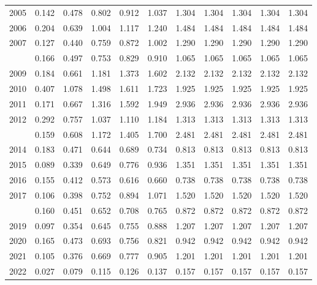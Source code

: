 \documentclass[
]{article}
\begin{document}
\begin{longtable}[t]{lrrrrrrrrrr}
2005 & 0.142 & 0.478 & 0.802 & 0.912 & 1.037 & 1.304 & 1.304 & 1.304 & 1.304 & 1.304\\
2006 & 0.204 & 0.639 & 1.004 & 1.117 & 1.240 & 1.484 & 1.484 & 1.484 & 1.484 & 1.484\\
2007 & 0.127 & 0.440 & 0.759 & 0.872 & 1.002 & 1.290 & 1.290 & 1.290 & 1.290 & 1.290\\
\addlinespace
2008 & 0.166 & 0.497 & 0.753 & 0.829 & 0.910 & 1.065 & 1.065 & 1.065 & 1.065 & 1.065\\
2009 & 0.184 & 0.661 & 1.181 & 1.373 & 1.602 & 2.132 & 2.132 & 2.132 & 2.132 & 2.132\\
2010 & 0.407 & 1.078 & 1.498 & 1.611 & 1.723 & 1.925 & 1.925 & 1.925 & 1.925 & 1.925\\
2011 & 0.171 & 0.667 & 1.316 & 1.592 & 1.949 & 2.936 & 2.936 & 2.936 & 2.936 & 2.936\\
2012 & 0.292 & 0.757 & 1.037 & 1.110 & 1.184 & 1.313 & 1.313 & 1.313 & 1.313 & 1.313\\
\addlinespace
2013 & 0.159 & 0.608 & 1.172 & 1.405 & 1.700 & 2.481 & 2.481 & 2.481 & 2.481 & 2.481\\
2014 & 0.183 & 0.471 & 0.644 & 0.689 & 0.734 & 0.813 & 0.813 & 0.813 & 0.813 & 0.813\\
2015 & 0.089 & 0.339 & 0.649 & 0.776 & 0.936 & 1.351 & 1.351 & 1.351 & 1.351 & 1.351\\
2016 & 0.155 & 0.412 & 0.573 & 0.616 & 0.660 & 0.738 & 0.738 & 0.738 & 0.738 & 0.738\\
2017 & 0.106 & 0.398 & 0.752 & 0.894 & 1.071 & 1.520 & 1.520 & 1.520 & 1.520 & 1.520\\
\addlinespace
2018 & 0.160 & 0.451 & 0.652 & 0.708 & 0.765 & 0.872 & 0.872 & 0.872 & 0.872 & 0.872\\
2019 & 0.097 & 0.354 & 0.645 & 0.755 & 0.888 & 1.207 & 1.207 & 1.207 & 1.207 & 1.207\\
2020 & 0.165 & 0.473 & 0.693 & 0.756 & 0.821 & 0.942 & 0.942 & 0.942 & 0.942 & 0.942\\
2021 & 0.105 & 0.376 & 0.669 & 0.777 & 0.905 & 1.201 & 1.201 & 1.201 & 1.201 & 1.201\\
2022 & 0.027 & 0.079 & 0.115 & 0.126 & 0.137 & 0.157 & 0.157 & 0.157 & 0.157 & 0.157\\*
\end{longtable}
\end{document}

